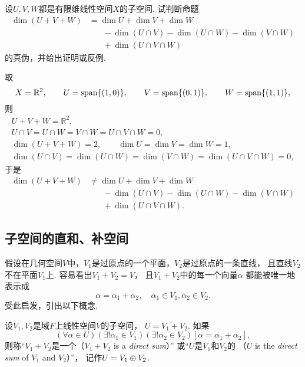 \begin{example}
设\(U,V,W\)都是有限维线性空间\(X\)的子空间.
试判断命题\begin{align*}
	\dim(U+V+W)
	&= \dim U + \dim V + \dim W \\
	&\hspace{20pt} - \dim(U \cap V) - \dim (U \cap W) - \dim(V \cap W) \\
	&\hspace{20pt} + \dim(U \cap V \cap W)
\end{align*}
的真伪，并给出证明或反例.
\begin{solution}
取\[
	X = \mathbb{R}^2,
	\qquad
	U = \operatorname{span}\{(1,0)\},
	\qquad
	V = \operatorname{span}\{(0,1)\},
	\qquad
	W = \operatorname{span}\{(1,1)\},
\]
则\begin{gather*}
	U + V + W = \mathbb{R}^2, \\
	U \cap V
	= U \cap W
	= V \cap W
	= U \cap V \cap W
	= 0, \\
	\dim(U + V + W) = 2,
	\qquad
	\dim U = \dim V = \dim W = 1, \\
	\dim(U \cap V)
	= \dim(U \cap W)
	= \dim(V \cap W)
	= \dim(U \cap V \cap W)
	= 0,
\end{gather*}
于是\begin{align*}
	\dim(U+V+W)
	&\neq \dim U + \dim V + \dim W \\
	&\hspace{20pt} - \dim(U \cap V) - \dim (U \cap W) - \dim(V \cap W) \\
	&\hspace{20pt} + \dim(U \cap V \cap W).
\end{align*}
\end{solution}
\end{example}

\subsection{子空间的直和、补空间}
假设在几何空间\(V\)中，\(V_1\)是过原点的一个平面，\(V_2\)是过原点的一条直线，
且直线\(V_2\)不在平面\(V_1\)上.
容易看出\(V_1 + V_2 = V\)，
且\(V_1 + V_2\)中的每一个向量\(\alpha\)
都能被唯一地表示成\[
	\alpha = \alpha_1 + \alpha_2,
	\quad
	\alpha_1 \in V_1,
	\alpha_2 \in V_2.
\]
受此启发，引出以下概念.
\begin{definition}
设\(V_1,V_2\)是域\(F\)上线性空间\(V\)的子空间，
\(U = V_1 + V_2\).
如果\[
	(\forall\alpha\in U)
	(\exists!\alpha_1\in V_1)
	(\exists!\alpha_2\in V_2)
	[\alpha=\alpha_1+\alpha_2],
\]
则称“\(V_1+V_2\)是一个（\(V_1+V_2\) is a \emph{direct sum}）”
或“\(U\)是\(V_1\)和\(V_2\)的%
（\(U\) is the \emph{direct sum} of \(V_1\) and \(V_2\)）”，
记作\(U = V_1 \oplus V_2\).
\end{definition}

